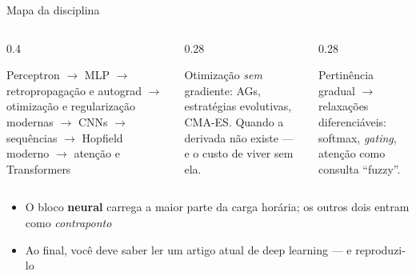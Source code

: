 \documentclass[aspectratio=169, 11pt]{beamer}
\begin{document}
\begin{frame}{Mapa da disciplina}
  \begin{columns}[T]
    \begin{column}{0.4\textwidth}
      \begin{tcolorbox}[iccaixa=icNeural, title={Redes neurais e deep learning}]
        \small Perceptron $\to$ MLP $\to$ retropropagação e autograd $\to$
        otimização e regularização modernas $\to$ CNNs $\to$ sequências $\to$
        Hopfield moderno $\to$ atenção e Transformers
      \end{tcolorbox}
    \end{column}
    \begin{column}{0.28\textwidth}
      \begin{tcolorbox}[iccaixa=icEvol, title={Computação evolutiva}]
        \small Otimização \emph{sem} gradiente: AGs, estratégias evolutivas,
        CMA-ES. Quando a derivada não existe — e o custo de viver sem ela.
      \end{tcolorbox}
    \end{column}
    \begin{column}{0.28\textwidth}
      \begin{tcolorbox}[iccaixa=icFuzzy, title={Sistemas nebulosos}]
        \small Pertinência gradual $\to$ relaxações diferenciáveis: softmax,
        \emph{gating}, atenção como consulta ``fuzzy''.
      \end{tcolorbox}
    \end{column}
  \end{columns}

  \medskip
  \begin{itemize}\setlength{\itemsep}{0.25ex}
    \item O bloco {\color{icNeural}\textbf{neural}} carrega a maior parte
          da carga horária; os outros dois entram como \emph{contraponto}
    \item Ao final, você deve saber ler um artigo atual de deep learning —
          e reproduzi-lo
  \end{itemize}
\end{frame}
\end{document}
